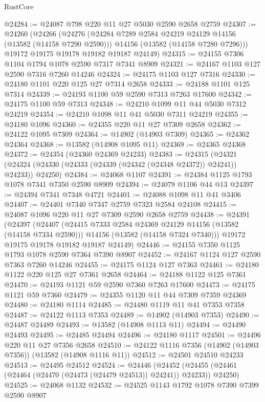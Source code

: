 \begin{lexlean}{RustCore}
\begin{coremodule}
@24284 := @24087 @798 @220 @11 @27 @5030 @2590 @2658 @2759
@24307 := @24260
    (@24266
      (@24276
        (@24284 @7289 @2584 @24219 @24129 @14156 (@13582 (@14158 @7290 @2590)))
        @14156
        (@13582 (@14158 @7280 @7296)))
      @19172
      @19175
      @19178
      @19182
      @19187
      @24149)
@24315 := @24155 @7306 @1104 @1794 @1078 @2590 @7317 @7341 @8909
@24321 := @24167 @1103 @127 @2590 @7316 @7260 @14246
@24324 := @24175 @1103 @127 @7316
@24330 := @24180 @1101 @220 @125 @27 @7314 @2658
@24333 := @24188 @1101 @125 @7314
@24339 := @24193 @1100 @59 @2590 @7313 @7263 @17600
@24342 := @24175 @1100 @59 @7313
@24348 := @24210 @1099 @11 @44 @5030 @7312 @24219
@24354 := @24210 @1098 @11 @41 @5030 @7311 @24219
@24355 := @24180 @1096
@24360 := @24355 @220 @11 @27 @7309 @2658
@24362 := @24122 @1095 @7309
@24364 := @14902 (@14903 @7309)
@24365 := @24362 @24364
@24368 := @13582 (@14908 @1095 @11)
@24369 := @24365 @24368
@24372 := @24354 (@24360 @24369 @24233)
@24383 := @24315
    (@24321 (@24324 (@24330 (@24333 (@24339 (@24342 (@24348 @24372)) @24241)) @24233)) @24250)
@24384 := @24068 @1107
@24391 := @24384 @1125 @1793 @1078 @7341 @7350 @2590 @8909
@24394 := @24079 @1106 @44 @13
@24397 := @24394 @7341 @7348 @4721
@24401 := @24088 @1098 @11 @41 @3406
@24407 := @24401 @7340 @7347 @2759 @7323 @2584 @24108
@24415 := @24087 @1096 @220 @11 @27 @7309 @2590 @2658 @2759
@24438 := @24391
    (@24397
      (@24407
        (@24415 @7333 @2584 @24369 @24129 @14156 (@13582 (@14158 @7334 @2590)))
        @14156
        (@13582 (@14158 @7324 @7340)))
      @19172
      @19175
      @19178
      @19182
      @19187
      @24149)
@24446 := @24155 @7350 @1125 @1793 @1078 @2590 @7364 @7390 @8907
@24452 := @24167 @1124 @127 @2590 @7363 @7260 @14246
@24455 := @24175 @1124 @127 @7363
@24461 := @24180 @1122 @220 @125 @27 @7361 @2658
@24464 := @24188 @1122 @125 @7361
@24470 := @24193 @1121 @59 @2590 @7360 @7263 @17600
@24473 := @24175 @1121 @59 @7360
@24479 := @24355 @1120 @11 @44 @7309 @7359 @24369
@24480 := @24180 @1114
@24485 := @24480 @1119 @11 @41 @7353 @7358
@24487 := @24122 @1113 @7353
@24489 := @14902 (@14903 @7353)
@24490 := @24487 @24489
@24493 := @13582 (@14908 @1113 @11)
@24494 := @24490 @24493
@24495 := @24485 @24494
@24496 := @24180 @1117
@24501 := @24496 @220 @11 @27 @7356 @2658
@24510 := @24122 @1116 @7356 (@14902 (@14903 @7356)) (@13582 (@14908 @1116 @11))
@24512 := @24501 @24510 @24233
@24513 := @24495 @24512
@24524 := @24446
    (@24452 (@24455 (@24461 (@24464 (@24470 (@24473 (@24479 @24513)) @24241)) @24233)) @24250)
@24525 := @24068 @1132
@24532 := @24525 @1143 @1792 @1078 @7390 @7399 @2590 @8907

\end{coremodule}
\end{lexlean}
